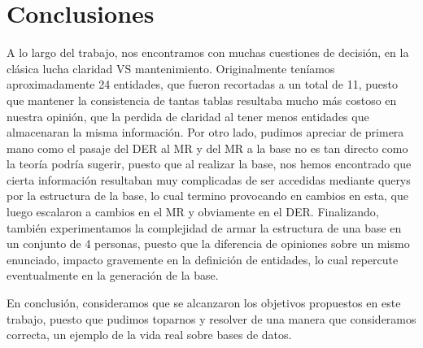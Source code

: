 \section{Conclusiones}

A lo largo del trabajo, nos encontramos con muchas cuestiones de decisión, en la clásica lucha claridad VS mantenimiento. Originalmente teníamos aproximadamente 24 entidades, que fueron recortadas a un total de 11, puesto que mantener la consistencia de tantas tablas resultaba mucho más costoso en nuestra opinión, que la perdida de claridad al tener menos entidades que almacenaran la misma información. Por otro lado, pudimos apreciar de primera mano como el pasaje del DER al MR y del MR a la base no es tan directo como la teoría podría sugerir, puesto que al realizar la base, nos hemos encontrado que cierta información resultaban muy complicadas de ser accedidas mediante querys por la estructura de la base, lo cual termino provocando en cambios en esta, que luego escalaron a cambios en el MR y obviamente en el DER. Finalizando, también experimentamos la complejidad de armar la estructura de una base en un conjunto de 4 personas, puesto que la diferencia de opiniones sobre un mismo enunciado, impacto gravemente en la definición de entidades, lo cual repercute eventualmente en la generación de la base.

En conclusión, consideramos que se alcanzaron los objetivos propuestos en este trabajo, puesto que pudimos toparnos y resolver de una manera que consideramos correcta, un ejemplo de la vida real sobre bases de datos.